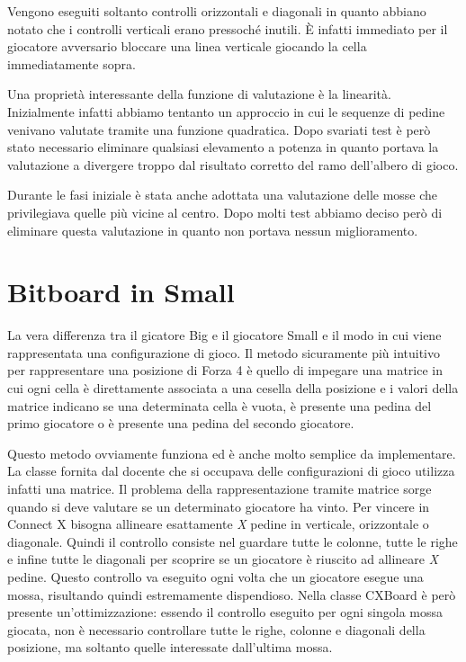 \documentclass[a4paper]{article}
\begin{document}
Vengono eseguiti soltanto controlli orizzontali e diagonali in quanto abbiano 
notato che i controlli verticali erano pressoché inutili. È infatti immediato 
per il giocatore avversario bloccare una linea verticale giocando la cella
immediatamente sopra.

Una proprietà interessante della funzione di valutazione è la linearità. 
Inizialmente infatti abbiamo tentanto un approccio in cui le sequenze di pedine 
venivano valutate tramite una funzione quadratica. Dopo svariati test è però 
stato necessario eliminare qualsiasi elevamento a potenza in quanto portava la 
valutazione a divergere troppo dal risultato corretto del ramo dell'albero di 
gioco.

Durante le fasi iniziale è stata anche adottata una valutazione delle mosse che
privilegiava quelle più vicine al centro. Dopo molti test abbiamo deciso però di
eliminare questa valutazione in quanto non portava nessun miglioramento.

\section{Bitboard in Small}
\label{sec_bitboard}
La vera differenza tra il gicatore Big e il giocatore Small e il modo in cui
viene rappresentata una configurazione di gioco. Il metodo sicuramente più
intuitivo per rappresentare una posizione di Forza 4 è quello di impegare una 
matrice in cui ogni cella è direttamente associata a una cesella della 
posizione e i valori della matrice indicano se una determinata cella è vuota, 
è presente una pedina del primo giocatore o è presente una pedina del secondo 
giocatore.

Questo metodo ovviamente funziona ed è anche molto semplice da implementare. La
classe fornita dal docente che si occupava delle configurazioni di gioco 
utilizza infatti una matrice. Il problema della rappresentazione tramite matrice
sorge quando si deve valutare se un determinato giocatore ha vinto. Per vincere
in Connect X bisogna allineare esattamente \emph{X} pedine in verticale, 
orizzontale o diagonale. Quindi il controllo consiste nel guardare tutte le 
colonne, tutte le righe e infine tutte le diagonali per scoprire se un giocatore
è riuscito ad allineare \emph{X} pedine. Questo controllo va eseguito ogni volta
che un giocatore esegue una mossa, risultando quindi estremamente dispendioso.
Nella classe CXBoard è però presente un'ottimizzazione: essendo il controllo 
eseguito per ogni singola mossa giocata, non è necessario controllare tutte le
righe, colonne e diagonali della posizione, ma soltanto quelle interessate 
dall'ultima mossa.
\end{document}

